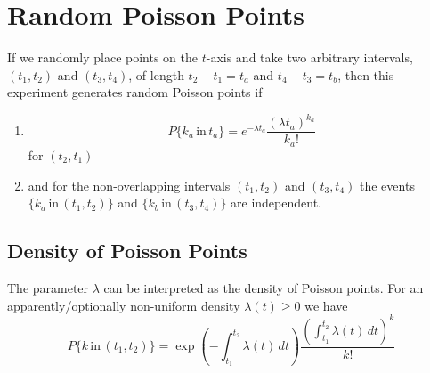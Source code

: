 \documentclass{article}
\begin{document}
	\section{Random Poisson Points}
		If we randomly place points on the $t$-axis and take two arbitrary intervals, $(t_1,t_2)$ and $(t_3,t_4)$, of length $t_2-t_1=t_a$ and $t_4-t_3=t_b$, then this experiment generates random Poisson points if 
		\begin{enumerate}
			\item
				\begin{equation}
					P\{k_a\mathrm{\,in\,}t_a\}=e^{-\lambda t_a}\frac{(\lambda t_a)^{k_a}}{k_a!}
				\end{equation}
				for $(t_2,t_1)$
			\item and for the non-overlapping intervals $(t_1,t_2)$ and $(t_3,t_4)$ the events $\{k_a\mathrm{\,in\,}(t_1,t_2)\}$ and $\{k_b\mathrm{\,in\,}(t_3,t_4)\}$ are independent.
		\end{enumerate}
		\subsection{Density of Poisson Points}
				The parameter $\lambda$ can be interpreted as the density of Poisson points. For an apparently/optionally non-uniform density $\lambda(t)\geq 0$ we have
				\begin{equation}
					P\{k\mathrm{\,in\,}(t_1,t_2)\}=\exp{\left(-\int_{t_1}^{t_2}{\lambda(t)\,dt}\right)}\frac{\left(\int_{t_1}^{t_2}{\lambda(t)\,dt}\right)^k}{k!}
				\end{equation}			
		
\end{document}
